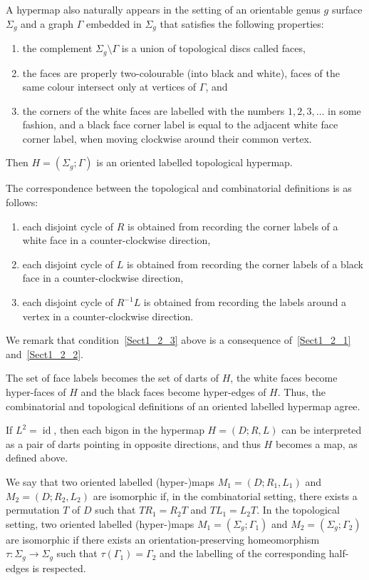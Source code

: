 \documentclass[ALCO,ThmDefs,Unicode,epreuves]{cedram}
\DeclareMathOperator{\id}{id}
\begin{document}
A hypermap also naturally appears in the setting of an orientable genus $g$ surface $\Sigma_g$ and a graph $\Gamma$ embedded in $\Sigma_g$ that satisfies the following properties:
\begin{enumerate}
\item\label{Sect1_1_1} %
the complement $\Sigma_g \setminus \Gamma$ is a union of topological discs called faces,
\item\label{Sect1_1_2} %
the faces are properly two-colourable (\eg into black and white), \ie faces of the same colour intersect only at vertices of $\Gamma$, and
\item\label{Sect1_1_3} %
the corners of the white faces are labelled with the numbers $1, 2, 3, \dots$ in some fashion, and a black face corner label is equal to the adjacent white face corner label, when moving clockwise around their common vertex.
\end{enumerate}
Then $H = ( \Sigma_g; \Gamma )$ is an oriented labelled topological hypermap. 

The correspondence between the topological and combinatorial definitions is as follows: 
\begin{enumerate}
\item\label{Sect1_2_1} %
each disjoint cycle of $R$ is obtained from recording the corner labels of a white face in a counter-clockwise direction,
\item\label{Sect1_2_2} %
each disjoint cycle of $L$ is obtained from recording the corner labels of a black face in a counter-clockwise direction,
\item\label{Sect1_2_3} %
each disjoint cycle of $R^{-1}L$ is obtained from recording the labels around a vertex in a counter-clockwise direction.
\end{enumerate}
We remark that condition~\eqref{Sect1_2_3} above is a consequence of~\eqref{Sect1_2_1} and~\eqref{Sect1_2_2}.

The set of face labels becomes the set of darts of $H$, the white faces become hyper-faces of $H$ and the black faces become hyper-edges of $H$. Thus, the combinatorial and topological definitions of an oriented labelled hypermap agree. 

If $L^2 = \id $, then each bigon in the hypermap 
$H = ( D; R, L )$ can be interpreted as a pair of darts pointing in opposite directions, and thus $H$ becomes a map, as defined above. 

We say that two oriented labelled (hyper-)maps $M_1 = (D; R_1, L_1)$ and $M_2 = (D; R_2, L_2)$ are isomorphic if, in the combinatorial setting, there exists a permutation $T$ of $D$ such that $T R_1 = R_2 T$ and $T L_1 = L_2 T$. In the topological setting, two oriented labelled (hyper-)maps $M_1 = (\Sigma_g; \Gamma_1)$ and $M_2 = (\Sigma_g; \Gamma_2)$ are isomorphic if there exists an orientation-preserving homeomorphism $\tau: \Sigma_g \rightarrow \Sigma_g$ such that $\tau(\Gamma_1) = \Gamma_2$ and the labelling of the corresponding half-edges is respected. 
\end{document}
